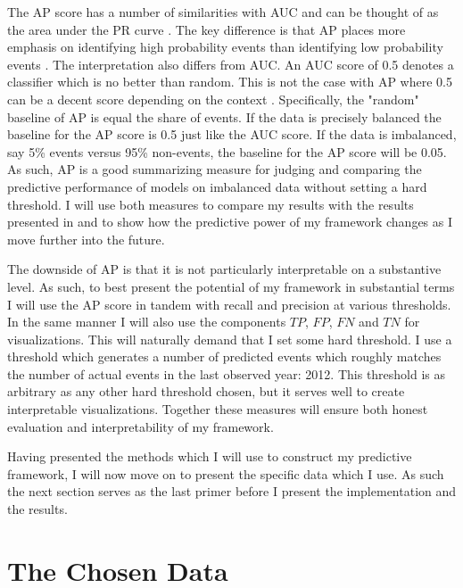 \documentclass[a4paper]{article}
\begin{document}
The AP score has a number of similarities with AUC and can be thought of as the area under the PR curve  \citep[349-350]{su2015relationship}. The key difference is that AP places more emphasis on identifying high probability events than identifying low probability events \citep[350]{su2015relationship}. The interpretation also differs from AUC. An AUC score of 0.5 denotes a classifier which is no better than random. This is not the case with AP where 0.5 can be a decent score depending on the context \citep[350-351]{su2015relationship}. Specifically, the "random" baseline of AP is equal the share of events. If the data is precisely balanced the baseline for the AP score is 0.5 just like the AUC score. If the data is imbalanced, say 5\% events versus 95\% non-events, the baseline for the AP score will be 0.05. As such, AP is a good summarizing measure for judging and comparing the predictive performance of models on imbalanced data without setting a hard threshold. I will use both measures to compare my results with the results presented in \cite{Maase} and to show how the predictive power of my framework changes as I move further into the future.\par

The downside of AP is that it is not particularly interpretable on a substantive level. As such, to best present the potential of my framework in substantial terms I will use the AP score in tandem with recall and precision at various thresholds. In the same manner I will also use the components $TP$, $FP$, $FN$ and $TN$ for visualizations. This will naturally demand that I set some hard threshold. I use a threshold which generates a number of predicted events which roughly matches the number of actual events in the last observed year: 2012. This threshold is as arbitrary as any other hard threshold chosen, but it serves well to create interpretable visualizations. Together these measures will ensure both honest evaluation and interpretability of my framework.\par %

Having presented the methods which I will use to construct my predictive framework, I will now move on to present the specific data which I use. As such the next section serves as the last primer before I present the implementation and the results.\par

\section{The Chosen Data}\label{data}%
\end{document}
